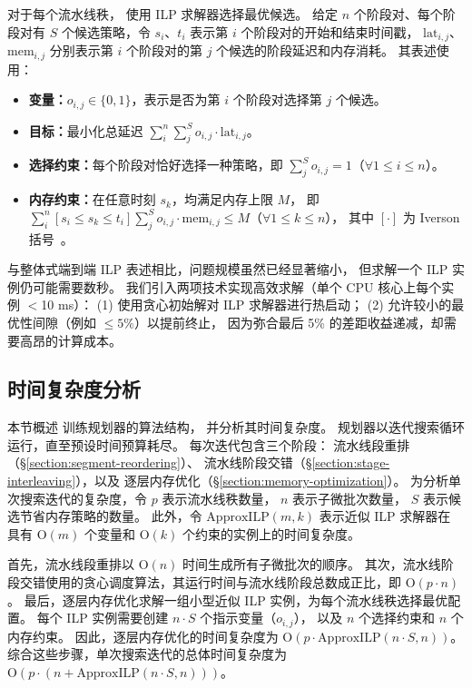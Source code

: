 对于每个流水线秩，\sys{} 使用 ILP 求解器选择最优候选。
给定 $n$ 个阶段对、每个阶段对有 $S$ 个候选策略，令 $s_i$、$t_i$ 表示第 $i$ 个阶段对的开始和结束时间戳，
$\mathrm{lat}_{i,j}$、$\mathrm{mem}_{i,j}$ 分别表示第 $i$ 个阶段对的第 $j$ 个候选的阶段延迟和内存消耗。
其表述使用：

\begin{itemize}
    \item \textbf{变量：}$o_{i,j} \in \{0,1\}$，表示是否为第 $i$ 个阶段对选择第 $j$ 个候选。
    \item \textbf{目标：}最小化总延迟 $\sum_i^n \sum_j^S o_{i,j} \cdot \mathrm{lat}_{i,j}$。
    \item \textbf{选择约束：}每个阶段对恰好选择一种策略，即 $\sum_j^S o_{i,j}=1$（$\forall 1 \leq i \leq n$）。
    \item \textbf{内存约束：}在任意时刻 $s_k$，均满足内存上限 $M$，
    即 $\sum_i^n [s_i \leq s_k \leq t_i] \sum_j^S o_{i,j} \cdot \mathrm{mem}_{i,j} \leq M$（$\forall 1 \leq k \leq n$），
    其中 $[\cdot]$ 为 Iverson 括号~\cite{iverson-bracket}。
\end{itemize}

与整体式端到端 ILP 表述相比，问题规模虽然已经显著缩小，
但求解一个 ILP 实例仍可能需要数秒。
我们引入两项技术实现高效求解（单个 CPU 核心上每个实例 $<$10 ms）：
(1) 使用贪心初始解对 ILP 求解器进行热启动；
(2) 允许较小的最优性间隙（例如 $\leq 5\%$）以提前终止，
因为弥合最后 5\% 的差距收益递减，却需要高昂的计算成本。

\subsection{时间复杂度分析}

本节概述 {\sys} 训练规划器的算法结构，
并分析其时间复杂度。
规划器以迭代搜索循环运行，直至预设时间预算耗尽。
每次迭代包含三个阶段：
流水线段重排（\S\ref{section:segment-reordering}）、
流水线阶段交错（\S\ref{section:stage-interleaving}），以及
逐层内存优化（\S\ref{section:memory-optimization}）。
为分析单次搜索迭代的复杂度，令
$p$ 表示流水线秩数量，
$n$ 表示子微批次数量，
$S$ 表示候选节省内存策略的数量。
此外，令 $\mathrm{ApproxILP}(m,k)$ 表示近似 ILP 求解器在
具有 $\mathrm O(m)$ 个变量和 $\mathrm O(k)$ 个约束的实例上的时间复杂度。

首先，流水线段重排以 $\mathrm O(n)$ 时间生成所有子微批次的顺序。
其次，流水线阶段交错使用的贪心调度算法，其运行时间与流水线阶段总数成正比，即 $\mathrm O(p \cdot n)$。
最后，逐层内存优化求解一组小型近似 ILP 实例，为每个流水线秩选择最优配置。
每个 ILP 实例需要创建 $n \cdot S$ 个指示变量（$o_{i,j}$），
以及 $n$ 个选择约束和 $n$ 个内存约束。
因此，逐层内存优化的时间复杂度为 $\mathrm O(p \cdot \mathrm{ApproxILP}(n \cdot S,n))$。
综合这些步骤，单次搜索迭代的总体时间复杂度为 $\mathrm O(p \cdot (n + \mathrm{ApproxILP}(n \cdot S,n)))$。

